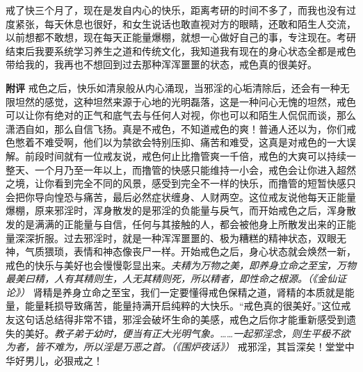 \begin{case}\label{Xiangdoubuganxiang}
    戒了快三个月了，现在是发自内心的快乐，距离考研的时间不多了，而我也没有过度紧张，每天休息也很好，和女生说话也敢直视对方的眼睛，还敢和陌生人交流，以前想都不敢想，现在每天正能量爆棚，就想一心做好自己的事，专注现在。考研结束后我要系统学习养生之道和传统文化，我知道我有现在的身心状态全都是戒色带给我的，我再也不想回到过去那种浑浑噩噩的状态，戒色真的很美好。

    \textbf{附评} 戒色之后，快乐如清泉般从内心涌现，当邪淫的心垢清除后，还会有一种无限坦然的感觉，这种坦然来源于心地的光明磊落，这是一种问心无愧的坦然，戒色可以让你有绝对的正气和底气去与任何人对视，你也可以和陌生人侃侃而谈，那么潇洒自如，那么自信飞扬。真是不戒色，不知道戒色的爽！普通人还以为，你们戒色憋着不难受啊，他们以为禁欲会特别压抑、痛苦和难受，这真是对戒色的一大误解。前段时间就有一位戒友说，戒色何止比撸管爽一千倍，戒色的大爽可以持续一整天、一个月乃至一年以上，而撸管的快感只能维持一小会，戒色会让你进入超然之境，让你看到完全不同的风景，感受到完全不一样的快乐，而撸管的短暂快感只会把你导向惶恐与痛苦，最后必然症状缠身、人财两空。这位戒友说他每天正能量爆棚，原来邪淫时，浑身散发的是邪淫的负能量与戾气，而开始戒色之后，浑身散发的是满满的正能量与自信，任何与其接触的人，都会被他身上所散发出来的正能量深深折服。过去邪淫时，就是一种浑浑噩噩的、极为糟糕的精神状态，双眼无神，气质猥琐，表情和神态像丧尸一样。开始戒色之后，身心状态就会焕然一新，戒色的快乐与美好也会慢慢彰显出来。\textit{夫精为万物之美，即养身立命之至宝，万物最美曰精，人有其精则生，人无其精则死，所以精者，即性命之根源。（《金仙证论》）} 肾精是养身立命之至宝，我们一定要懂得戒色保精之道，肾精的本质就是能量，能量耗损导致痛苦，能量持满开启纯粹的大快乐。“戒色真的很美好。”这位戒友这句话总结得非常不错，邪淫会破坏生命的美感，戒色之后你才能重新感受到遗失的美好。\textit{教子弟于幼时，便当有正大光明气象。……一起邪淫念，则生平极不欲为者，皆不难为，所以淫是万恶之首。（《围炉夜话》）} 戒邪淫，其旨深矣！堂堂中华好男儿，必狠戒之！
\end{case}


